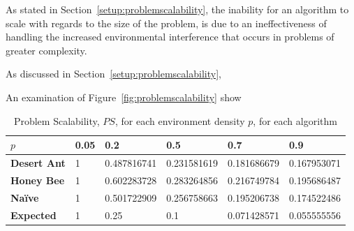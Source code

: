 As stated in Section~\ref{setup:problemscalability}, the inability for an algorithm to scale with regards to the size of the problem, is due to an ineffectiveness of handling the increased environmental interference that occurs in problems of greater complexity.






As discussed in Section~\ref{setup:problemscalability}, 


An examination of Figure~\ref{fig:problemscalability} show 

\begin{table}[]
\centering
\caption{Problem Scalability, $PS$, for each environment density $p$, for each algorithm}
\label{table:problemscalability}
\begin{tabular}{@{}llllll@{}}
\toprule
\textbf{$p$}                  & \textbf{0.05} & \textbf{0.2        } & \textbf{0.5}         & \textbf{0.7}         & \textbf{0.9}         \\ \midrule
\textbf{Desert Ant}           & 1    & 0.487816741 & 0.231581619 & 0.181686679 & 0.167953071 \\
\textbf{Honey Bee}            & 1    & 0.602283728 & 0.283264856 & 0.216749784 & 0.195686487 \\
\textbf{Na\"ive}              & 1    & 0.501722909 & 0.256758663 & 0.195206738 & 0.174522486 \\
\textbf{Expected} & 1    & 0.25        & 0.1         & 0.071428571 & 0.055555556 \\ \bottomrule
\end{tabular}
\end{table}

